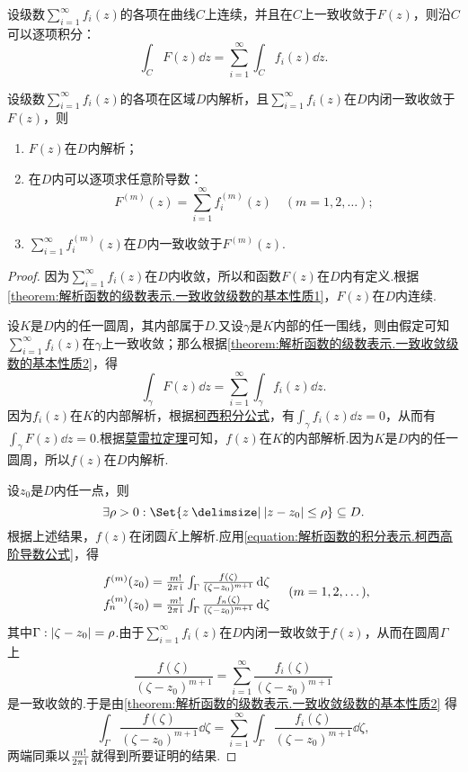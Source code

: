 \begin{theorem}\label{theorem:解析函数的级数表示.一致收敛级数的基本性质2}
设级数\(\sum\limits_{i=1}^\infty f_i(z)\)的各项在曲线\(C\)上连续，并且在\(C\)上一致收敛于\(F(z)\)，则沿\(C\)可以逐项积分：\[
\int_C F(z) \dd{z}
= \sum\limits_{i=1}^\infty \int_C f_i(z) \dd{z}.
\]
\end{theorem}

\begin{theorem}[魏尔斯特拉斯定理]\label{theorem:解析函数的级数表示.魏尔斯特拉斯定理}
设级数\(\sum\limits_{i=1}^\infty f_i(z)\)的各项在区域\(D\)内解析，且\(\sum\limits_{i=1}^\infty f_i(z)\)在\(D\)内闭一致收敛于\(F(z)\)，则\begin{enumerate}
\item \(F(z)\)在\(D\)内解析；
\item 在\(D\)内可以逐项求任意阶导数：\[
F^{(m)}(z) = \sum\limits_{i=1}^\infty f_i^{(m)}(z)
\quad(m=1,2,\dotsc);
\]
\item \(\sum\limits_{i=1}^\infty f_i^{(m)}(z)\)在\(D\)内一致收敛于\(F^{(m)}(z)\).
\end{enumerate}
\begin{proof}
因为\(\sum\limits_{i=1}^\infty f_i(z)\)在\(D\)内收敛，所以和函数\(F(z)\)在\(D\)内有定义.根据\cref{theorem:解析函数的级数表示.一致收敛级数的基本性质1}，\(F(z)\)在\(D\)内连续.

设\(K\)是\(D\)内的任一圆周，其内部属于\(D\).又设\(\gamma\)是\(K\)内部的任一围线，则由假定可知\(\sum\limits_{i=1}^\infty f_i(z)\)在\(\gamma\)上一致收敛；那么根据\cref{theorem:解析函数的级数表示.一致收敛级数的基本性质2}，得\[
\int_{\gamma} F(z) \dd{z} = \sum\limits_{i=1}^\infty \int_{\gamma} f_i(z) \dd{z}.
\]因为\(f_i(z)\)在\(K\)的内部解析，根据\hyperref[equation:解析函数的积分表示.柯西积分公式]{柯西积分公式}，有\(\int_{\gamma} f_i(z) \dd{z} = 0\)，从而有\(\int_{\gamma} F(z) \dd{z} = 0\).根据\hyperref[theorem:解析函数的积分表示.莫雷拉定理]{莫雷拉定理}可知，\(f(z)\)在\(K\)的内部解析.因为\(K\)是\(D\)内的任一圆周，所以\(f(z)\)在\(D\)内解析.

\def\f#1{f\ifx\relax#1\relax\else_{#1}\fi^{(m)}(z_0) = \frac{m!}{2\pi\iu} \int_{\Gamma} \frac{f\ifx\relax#1\relax\else_{#1}\fi(\zeta)}{(\zeta-z_0)^{m+1}} \dd{\zeta}}
设\(z_0\)是\(D\)内任一点，则\[
\exists \rho > 0 : \Set{ z \given \abs{z-z_0} \leq \rho } \subseteq D.
\]根据上述结果，\(f(z)\)在闭圆\(\overline{K}\)上解析.应用\cref{equation:解析函数的积分表示.柯西高阶导数公式}，得\[
\def\arraystretch{1.5}
\begin{array}{l}
\f{} \\
\f{n}
\end{array}
\quad(m=1,2,\dotsc),
\]其中\(\Gamma: \abs{\zeta-z_0}=\rho\).由于\(\sum\limits_{i=1}^\infty f_i(z)\)在\(D\)内闭一致收敛于\(f(z)\)，从而在圆周\(\Gamma\)上\[
\frac{f(\zeta)}{(\zeta-z_0)^{m+1}}
= \sum\limits_{i=1}^\infty \frac{f_i(\zeta)}{(\zeta-z_0)^{m+1}}
\]是一致收敛的.于是由\cref{theorem:解析函数的级数表示.一致收敛级数的基本性质2} 得\[
\int_{\Gamma} \frac{f(\zeta)}{(\zeta-z_0)^{m+1}} \dd{\zeta}
= \sum\limits_{i=1}^\infty \int_{\Gamma} \frac{f_i(\zeta)}{(\zeta-z_0)^{m+1}} \dd{\zeta},
\]两端同乘以\(\frac{m!}{2\pi\kern1pt\mathrm{i}\kern1pt}\)就得到所要证明的结果.
\end{proof}
\end{theorem}

